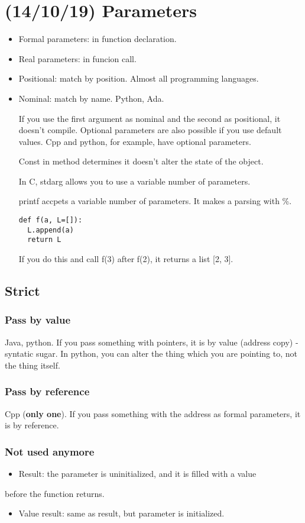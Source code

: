 \documentclass[11pt]{article}
\begin{document}
\section{(14/10/19) Parameters}
\label{sec:org5c8611c}
\begin{itemize}
\item Formal parameters: in function declaration.
\item Real parameters: in funcion call.

\item Positional: match by position. Almost all programming languages.
\item Nominal: match by name. Python, Ada.

If you use the first argument as nominal and the second as positional, it doesn't
compile. Optional parameters are also possible if you use default values. Cpp and
python, for example, have optional parameters.

Const in method determines it doesn't alter the state of the object.

In C, stdarg allows you to use a variable number of parameters.

printf accpets a variable number of parameters. It makes a parsing with \%.
\begin{verbatim}
def f(a, L=[]):
  L.append(a)
  return L
\end{verbatim}
If you do this and call f(3) after f(2), it returns a list [2, 3].
\end{itemize}
\subsection{Strict}
\label{sec:org6b76e21}
\subsubsection{Pass by value}
\label{sec:orgdd07042}
Java, python. If you pass something with pointers, it is by value (address copy) -
syntatic sugar. In python, you can alter the thing which you are pointing to, not the
thing itself.
\subsubsection{Pass by reference}
\label{sec:orgd9a08be}
Cpp (\textbf{only one}). If you pass something with the address as formal parameters, it is by
reference.
\subsubsection{Not used anymore}
\label{sec:org5e2791c}
\begin{itemize}
\item Result: the parameter is uninitialized, and it is filled with a value
\end{itemize}
before the function returns.
\begin{itemize}
\item Value result: same as result, but parameter is initialized.
\end{itemize}
\end{document}

